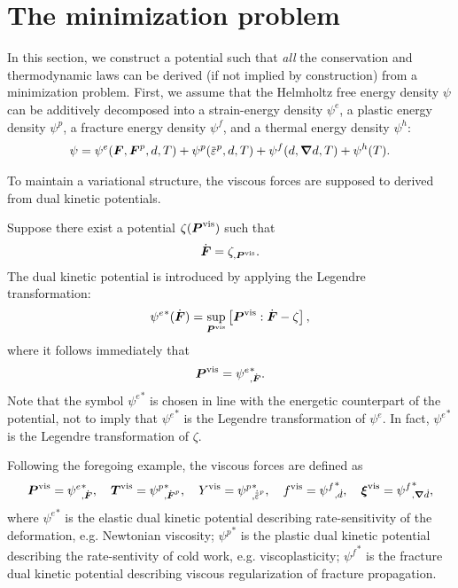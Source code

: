 \section{The minimization problem}
\label{section: framework/minimization}

In this section, we construct a potential such that \emph{all} the conservation and thermodynamic laws can be derived (if not implied by construction) from a minimization problem. First, we assume that the Helmholtz free energy density $\psi$ can be additively decomposed into a strain-energy density $\psi^e$, a plastic energy density $\psi^p$, a fracture energy density $\psi^f$, and a thermal energy density $\psi^h$:
\begin{align}
  \psi = \psi^e(\defgrad, \defgrad^p, d, T) + \psi^p(\ep, d, T) + \psi^f(d, \grad d, T) + \psi^h(T).
\end{align}

To maintain a variational structure, the viscous forces are supposed to derived from dual kinetic potentials.

\begin{example}
  \vspace{-0.5em}
  Suppose there exist a potential $\zeta(\boldsymbol{P}^\text{vis})$ such that
  \begin{align}
    \dot{\boldsymbol{F}} = \zeta_{,\boldsymbol{P}^\text{vis}}.
  \end{align}
  The dual kinetic potential is introduced by applying the Legendre transformation:
  \begin{align}
    {\psi^e}^*(\dot{\boldsymbol{F}}) = \sup_{\boldsymbol{P}^\text{vis}}\left[ \boldsymbol{P}^\text{vis}:\dot{\boldsymbol{F}} - \zeta \right],
  \end{align}
  where it follows immediately that
  \begin{align}
    \boldsymbol{P}^\text{vis} = {\psi^e}^*_{,\dot{\boldsymbol{F}}}.
  \end{align}
  Note that the symbol ${\psi^e}^*$ is chosen in line with the energetic counterpart of the potential, not to imply that ${\psi^e}^*$ is the Legendre transformation of $\psi^e$. In fact, ${\psi^e}^*$ is the Legendre transformation of $\zeta$.
\end{example}

Following the foregoing example, the viscous forces are defined as
\begin{align}
  \bfP^\text{vis} = {\psi^e}^*_{,\dot{\defgrad}}, \quad \bfT^\text{vis} = {\psi^p}^*_{,\dot{\defgrad}^p}, \quad Y^\text{vis} = {\psi^p}^*_{,\epdot}, \quad f^\text{vis} = {\psi^f}^*_{,\dot{d}}, \quad \bs{\xi}^\text{vis} = {\psi^f}^*_{,\grad\dot{d}},
\end{align}
where ${\psi^e}^*$ is the elastic dual kinetic potential describing rate-sensitivity of the deformation, e.g. Newtonian viscosity; ${\psi^p}^*$ is the plastic dual kinetic potential describing the rate-sentivity of cold work, e.g. viscoplasticity; ${\psi^f}^*$ is the fracture dual kinetic potential describing viscous regularization of fracture propagation.

